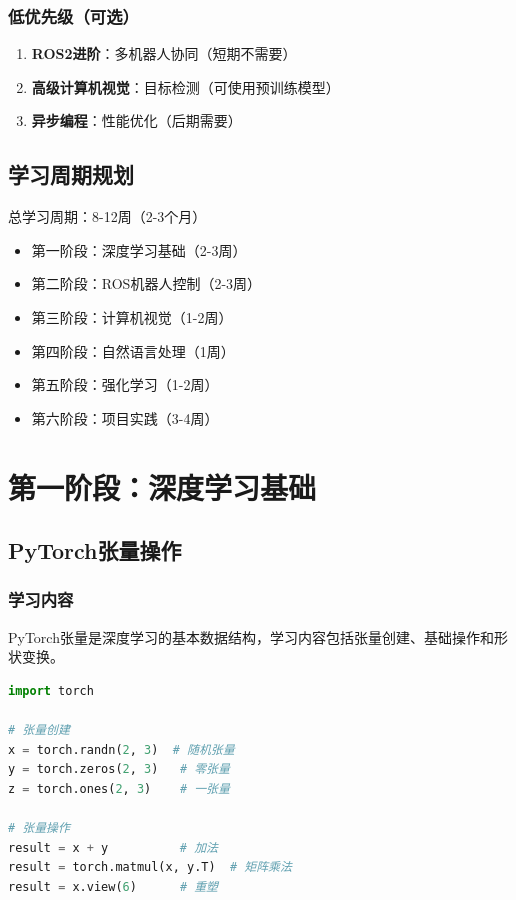 \documentclass[12pt,a4paper]{article}
\begin{document}
\subsubsection{低优先级（可选）}
\begin{enumerate}
    \item \textbf{ROS2进阶}：多机器人协同（短期不需要）
    \item \textbf{高级计算机视觉}：目标检测（可使用预训练模型）
    \item \textbf{异步编程}：性能优化（后期需要）
\end{enumerate}

\subsection{学习周期规划}

总学习周期：8-12周（2-3个月）
\begin{itemize}
    \item 第一阶段：深度学习基础（2-3周）
    \item 第二阶段：ROS机器人控制（2-3周）
    \item 第三阶段：计算机视觉（1-2周）
    \item 第四阶段：自然语言处理（1周）
    \item 第五阶段：强化学习（1-2周）
    \item 第六阶段：项目实践（3-4周）
\end{itemize}

\section{第一阶段：深度学习基础}

\subsection{PyTorch张量操作}

\subsubsection{学习内容}

PyTorch张量是深度学习的基本数据结构，学习内容包括张量创建、基础操作和形状变换。

\begin{lstlisting}[language=Python]
import torch

# 张量创建
x = torch.randn(2, 3)  # 随机张量
y = torch.zeros(2, 3)   # 零张量
z = torch.ones(2, 3)    # 一张量

# 张量操作
result = x + y          # 加法
result = torch.matmul(x, y.T)  # 矩阵乘法
result = x.view(6)      # 重塑
\end{lstlisting}
\end{document}
